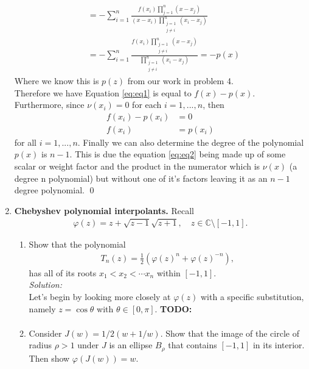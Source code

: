 \documentclass[10pt]{amsart}
\theoremstyle{nonumberplain}
\begin{document}
\begin{enumerate}[label={\bf {\arabic*}:}]
\begin{align}
	&= - \sum_{i=1}^n \frac{f(x_i)\prod_{j=1}^n (x - x_j)}{(x - x_i)\prod_{\substack{j=1 \\ j \neq i}}^n (x_i - x_j)} \nonumber \\
	&= - \sum_{i=1}^n \frac{f(x_i)\prod_{\substack{j=1 \\ j \neq i}}^n (x - x_j)}{\prod_{\substack{j=1 \\ j \neq i}}^n (x_i - x_j)}
\label{eq:eq2}
	= - p(x)
\end{align}
Where we know this is $p(z)$ from our work in problem 4. \\
Therefore we have Equation \eqref{eq:eq1} is equal to $f(x) - p(x)$.
Furthermore, since $\nu(x_i) = 0$ for each $i = 1, ..., n$, then
\begin{align*}
f(x_i) - p(x_i) &= 0 \\
f(x_i) &= p(x_i)
\end{align*}
for all $i = 1, ..., n$.
Finally we can also determine the degree of the polynomial $p(x)$ is $n - 1$.
This is due the equation \eqref{eq:eq2} being made up of some scalar or weight factor and the product in the numerator which is $\nu(x)$ (a degree n polynomial) but without one of it's factors leaving it as an $n - 1$ degree polynomial.
\qed \\

\newpage


\item  \textbf{Chebyshev polynomial interpolants.}  Recall 
\begin{align*}
\varphi(z) = z + \sqrt{z - 1} \sqrt{z +1}, \quad z \in \mathbb C \setminus [-1,1].
\end{align*}

\begin{enumerate}
\item Show that the polynomial
\begin{align*}
T_n(z) = \frac 1 2 \left( \varphi(z)^n + \varphi(z)^{-n} \right),
\end{align*}
has all of its roots $x_1 < x_2 < \cdots x_n$ within $[-1,1]$. \\

\noindent
\textit{Solution:} \\
Let's begin by looking more closely at $\varphi(z)$ with a specific substitution, namely $z = \cos \theta$ with $\theta \in [0, \pi]$.
\textbf{TODO:}
\begin{align*}
\end{align*}

\item Consider $J(w) =  1/2 (w + 1/w)$. 
Show that the image of the circle of radius $\rho > 1$ under $J$ is an ellipse $B_\rho$ that contains $[-1,1]$ in its interior.
Then show $\varphi(J(w)) = w$. \\


\end{enumerate}
\end{enumerate}
\end{document}
